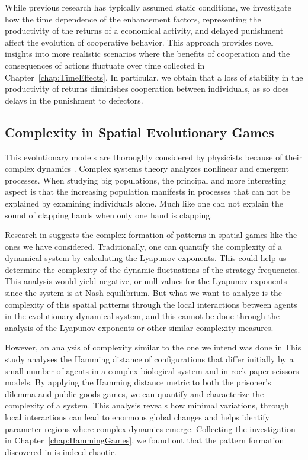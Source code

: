 While previous research has typically assumed static conditions, we investigate how the time dependence of the enhancement factors, representing the productivity of the returns of a economical activity, and delayed punishment affect the evolution of cooperative behavior. This approach provides novel insights into more realistic scenarios where the benefits of cooperation and the consequences of actions fluctuate over time collected in Chapter~\ref{chap:TimeEffects}. In particular, we obtain that a loss of stability in the productivity of returns diminishes cooperation between individuals, as so does delays in the punishment to defectors.

\subsection{Complexity in Spatial Evolutionary Games}

This evolutionary models are thoroughly considered by physicists because of their complex dynamics \cite{cit:GamesComplex}. Complex systems theory analyzes nonlinear and emergent processes. When studying big populations, the principal and more interesting aspect is that the increasing population manifests in processes that can not be explained by examining individuals alone. Much like one can not explain the sound of clapping hands when only one hand is clapping.

Research in \cite{cit:SpatialChaos} suggests the complex formation of patterns in spatial games like the ones we have considered. Traditionally, one can quantify the complexity of a dynamical system by calculating the Lyapunov exponents. This could help us determine the complexity of the dynamic fluctuations of the strategy frequencies. This analysis would yield negative, or null values for the Lyapunov exponents since the system is at Nash equilibrium. But what we want to analyze is the complexity of this spatial patterns through the local interactions between agents in the evolutionary dynamical system, and this cannot be done through the analysis of the Lyapunov exponents or other similar complexity measures. 

However, an analysis of complexity similar to the one we intend was done in \cite{cit:HammingChaos1,cit:HammingChaos2} This study analyses the Hamming distance of configurations that differ initially by a small number of agents in a complex biological system and in rock-paper-scissors models. By applying the Hamming distance metric to both the prisoner's dilemma and public goods games, we can quantify and characterize the complexity of a system. This analysis reveals how minimal variations, through local interactions can lead to enormous global changes and helps identify parameter regions where complex dynamics emerge. Collecting the investigation in Chapter~\ref{chap:HammingGames}, we found out that the pattern formation discovered in \cite{cit:SpatialChaos} is indeed chaotic. 

